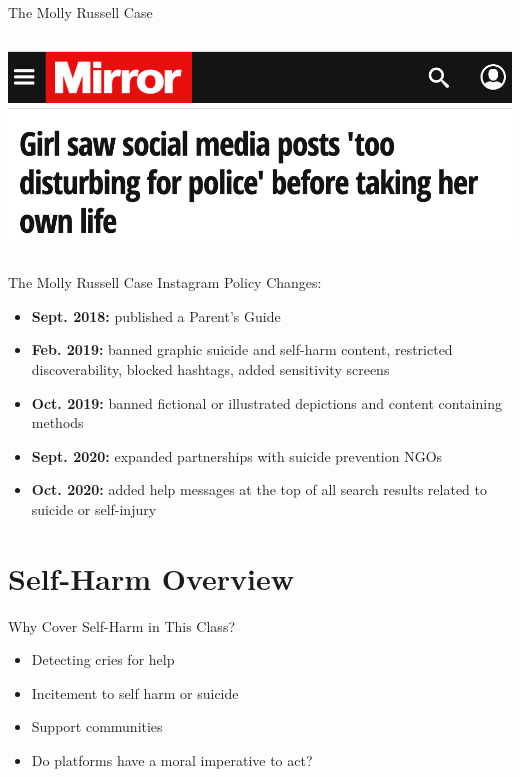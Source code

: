 \documentclass[nobackground,dvipsnames,table,aspectratio=169]{beamer}
\begin{document}
\begin{frame}{The Molly Russell Case}
\begin{columns}
            \includegraphics[width=\textwidth]{molly-russell-article-4}
    \end{columns}
\end{frame}

\begin{frame}{The Molly Russell Case}
    Instagram Policy Changes:\\
    \begin{itemize}
        \item \textbf{Sept. 2018:} published a Parent’s Guide
        \item \textbf{Feb. 2019:} banned graphic suicide and self-harm content, restricted discoverability, blocked hashtags, added sensitivity screens
        \item \textbf{Oct. 2019:} banned fictional or illustrated depictions and content containing methods
        \item \textbf{Sept. 2020:} expanded partnerships with suicide prevention NGOs
        \item \textbf{Oct. 2020:} added help messages at the top of all search results related to suicide or self-injury
    \end{itemize}
\end{frame}


\section{Self-Harm Overview}%

\begin{frame}{Why Cover Self-Harm in This Class?}
    \large
    \begin{itemize}
        \item Detecting cries for help
        \item Incitement to self harm or suicide
        \item Support communities
        \item Do platforms have a moral imperative to act?
    \end{itemize}
\end{frame}
\end{document}
